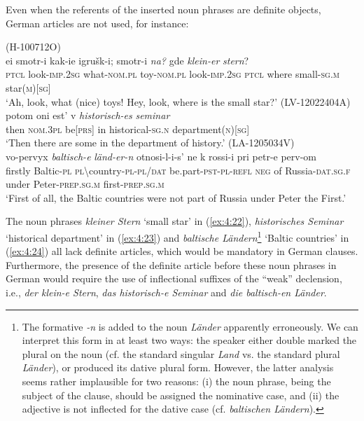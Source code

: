 \noindent Even when the referents of the inserted noun phrases are definite objects, German articles are not used, for instance:

\ea
\label{ex:4:22}
(H-100712O)\\
\gll ei  smotr-i kak-ie igrušk-i; smotr-i \textit{na?}  gde \textit{klein-er} \textit{stern}?\\
 \textsc{ptcl} look-\textsc{imp.2sg} what-\textsc{nom.pl} toy-\textsc{nom.pl} look-\textsc{imp.2sg} \textsc{ptcl} where small-\textsc{sg.m} star(\textsc{m})[\textsc{sg}]\\
\glt `Ah, look, what (nice) toys! Hey, look, where is the small star?'
\ex
\label{ex:4:23}
(LV-12022404A)\\
\gll potom oni est' v \textit{historisch-es} \textit{seminar}\\
 then \textsc{nom.3pl} be[\textsc{prs}] in historical-\textsc{sg.n} department(\textsc{n})[\textsc{sg}]\\
\glt `Then there are some in the department of history.'
\ex
\label{ex:4:24}
(LA-1205034V)\\
 \gll vo-pervyx \textit{baltisch-e} \textit{länd-er-n}  otnosi-l-i-s' ne k rossi-i pri petr-e perv-om\\
 firstly Baltic-\textsc{pl} \textsc{pl}\textbackslash{}country-\textsc{pl-pl/dat} be.part-\textsc{pst-pl-refl} \textsc{neg} of Russia-\textsc{dat.sg.f} under Peter-\textsc{prep.sg.m} first-\textsc{prep.sg.m}\\
\glt `First of all, the Baltic countries were not part of Russia under Peter the First.'
\z

\noindent The noun phrases \textit{kleiner Stern} `small star' in (\ref{ex:4:22}), \textit{historisches Seminar} `historical department' in (\ref{ex:4:23}) and \textit{baltische Ländern}\footnote{The formative \textit {-n} is added to the noun \textit{Länder} apparently erroneously. We can interpret this form in at least two ways: the speaker either double marked the plural on the noun (cf. the standard singular \textit{Land} vs. the standard plural \textit{Länder}), or produced its dative plural form. However, the latter analysis seems rather implausible for two reasons: (i) the noun phrase, being the subject of the clause, should be assigned the nominative case, and (ii) the adjective is not inflected for the dative case (cf. \textit{baltischen Ländern}).} `Baltic countries' in (\ref{ex:4:24}) all lack definite articles, which would be mandatory in German clauses. Furthermore, the presence of the definite article before these noun phrases in German would require the use of inflectional suffixes of the ``weak'' declension, i.e., \textit{der klein-e Stern}, \textit{das historisch-e Seminar} and \textit{die baltisch-en Länder}. 

